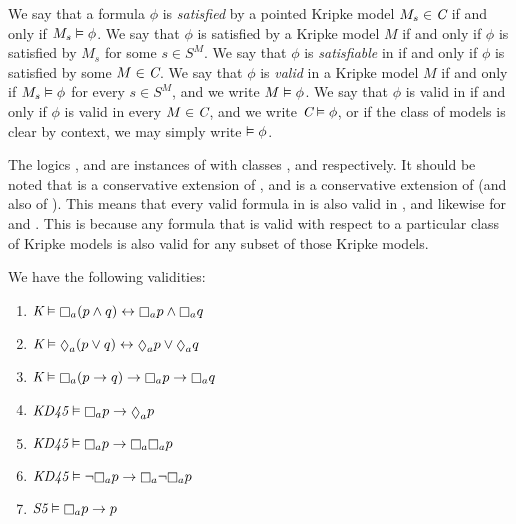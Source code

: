 We say that a formula $\phi$ is {\em satisfied} by a pointed Kripke model $M_s
\in \textit{C}$ if and only if $M_s \vDash \phi$. We say that $\phi$ is satisfied
by a Kripke model $M$ if and only if $\phi$ is satisfied by $M_s$ for some $s
\in S^M$.  We say that $\phi$ is {\em satisfiable} in \classC{} if and only if
$\phi$ is satisfied by some $M \in \textit{C}{}$. We say that $\phi$ is {\em valid}
in a Kripke model $M$ if and only if $M_s \vDash \phi$ for every $s \in S^M$,
and we write $M \vDash \phi$. We say that $\phi$ is valid in \classC{} if and
only if $\phi$ is valid in every $M \in \textit{C}{}$, and we write $\textit{C}{}
\vDash \phi$, or if the class of models is clear by context, we may simply
write $\vDash \phi$.

The logics \logicK{}, \logicKD{} and \logicS{} are instances of \logicC{} with
classes \classK{}, \classKD{} and \classS{} respectively. It should be noted
that \logicKD{} is a conservative extension of \logicK{}, and \logicS{} is a
conservative extension of \logicKD{} (and also of \logicK{}). This means that
every valid formula in \logicK{} is also valid in \logicKD{}, and likewise for
\logicKD{} and \logicS{}. This is because any formula that is valid with respect
to a particular class of Kripke models is also valid for any subset of those
Kripke models.

\begin{proposition}\label{modal-properties}
We have the following validities:

\begin{enumerate}
\item $\classK \entails \knows_a (p \land q) \iff \knows_a p \land
\knows_a q$
\item $\classK \entails \suspects_a (p \lor q) \iff \suspects_a p \lor
\suspects_a q$
\item $\classK \entails \knows_a (p \implies q) \implies \knows_a p
\implies \knows_a q$
\item $\classKD \entails \knows_a p \implies \suspects_a p$
\item $\classKD \entails \knows_a p \implies \knows_a \knows_a p$
\item $\classKD \entails \neg\knows_a p \implies \knows_a \neg \knows_a p$
\item $\classS \entails \knows_a p \implies p$
\end{enumerate}
\end{proposition}

